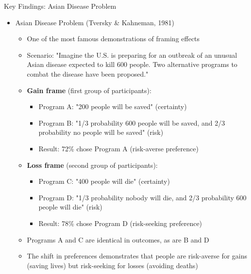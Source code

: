 \documentclass[10pt]{beamer}
\begin{document}
\begin{frame}{Key Findings: Asian Disease Problem}
  \begin{itemize}[<+->]
    \item Asian Disease Problem (Tversky \& Kahneman, 1981)
      \begin{itemize}
        \item One of the most famous demonstrations of framing effects
        \item Scenario: "Imagine the U.S. is preparing for an outbreak of an unusual Asian disease expected to kill 600 people. Two alternative programs to combat the disease have been proposed."
        \item \textbf{Gain frame} (first group of participants):
          \begin{itemize}
            \item Program A: "200 people will be saved" (certainty)
            \item Program B: "1/3 probability 600 people will be saved, and 2/3 probability no people will be saved" (risk)
            \item Result: 72\% chose Program A (risk-averse preference)
          \end{itemize}
        \item \textbf{Loss frame} (second group of participants):
          \begin{itemize}
            \item Program C: "400 people will die" (certainty)
            \item Program D: "1/3 probability nobody will die, and 2/3 probability 600 people will die" (risk)
            \item Result: 78\% chose Program D (risk-seeking preference)
          \end{itemize}
        \item Programs A and C are identical in outcomes, as are B and D
        \item The shift in preferences demonstrates that people are risk-averse for gains (saving lives) but risk-seeking for losses (avoiding deaths)
      \end{itemize}
  \end{itemize}
\end{frame}
\end{document}
